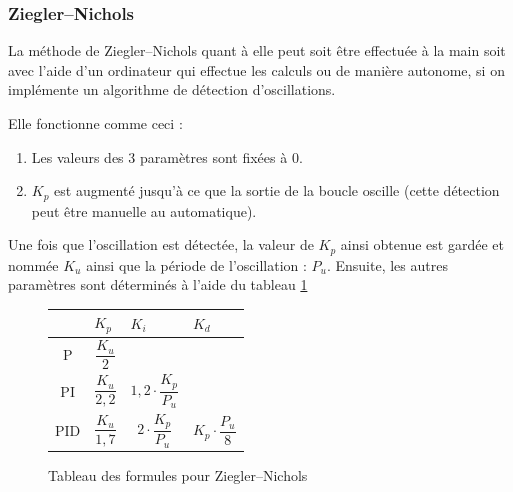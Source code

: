 \documentclass[a4paper,10pt]{report}
\begin{document}
\subsubsection{Ziegler–Nichols}
La méthode de Ziegler–Nichols quant à elle peut soit être effectuée à la main soit avec l'aide d'un ordinateur qui effectue les calculs ou de manière autonome, si on implémente un algorithme de détection d'oscillations.

Elle fonctionne comme ceci :
\begin{enumerate}
    \item Les valeurs des 3 paramètres sont fixées à $0$.
    \item $K_p$ est augmenté jusqu'à ce que la sortie de la boucle oscille (cette détection peut être manuelle au automatique).
\end{enumerate}

Une fois que l'oscillation est détectée, la valeur de $K_p$ ainsi obtenue est gardée et nommée $K_u$ ainsi que la période de l'oscillation : $P_u$.
Ensuite, les autres paramètres sont déterminés à l'aide du tableau \ref{tab:ZieglerNicholsTuningFormulas}

\def\tabularxcolumn#1{m{#1}}
\begin{figure}[ht]
    \begin{center}
        \begin{tabularx}{\textwidth}{| c | X | X | X |}
            \hline
            & $K_p$ & $K_i$ & $K_d$\\ \hline
            P & \begin{equation*}\frac{K_u}{2}\end{equation*} & &\\ \hline
            PI & \begin{equation*}\frac{K_u}{2,2}\end{equation*} & \begin{equation*}1,2 \cdot \frac{K_p}{P_u}\end{equation*} &\\ \hline
            PID & \begin{equation*}\frac{K_u}{1,7}\end{equation*} & \begin{equation*}2 \cdot \frac{K_p}{P_u}\end{equation*} & \begin{equation*}K_p \cdot \frac{P_u}{8}\end{equation*} \\
            \hline
        \end{tabularx}
    \end{center}
    \caption{Tableau des formules pour Ziegler–Nichols}
    \label{tab:ZieglerNicholsTuningFormulas}
\end{figure}
\end{document}
